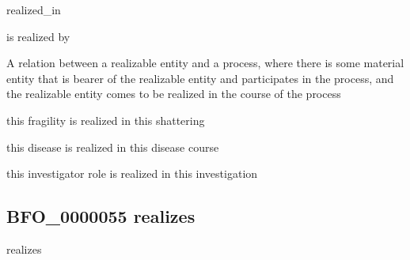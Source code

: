 \documentclass[letterpaper,10pt,english]{sphinxmanual}
\begin{document}
\begin{sphinxShadowBox}

\sphinxAtStartPar
realized\_in

\sphinxAtStartPar
is realized by
\end{sphinxShadowBox}

\begin{sphinxShadowBox}

\sphinxAtStartPar
{}
\end{sphinxShadowBox}

\begin{sphinxShadowBox}

\sphinxAtStartPar
A relation between a realizable entity and a process, where there is some material entity that is bearer of the realizable entity and participates in the process, and the realizable entity comes to be realized in the course of the process
\end{sphinxShadowBox}

\begin{sphinxShadowBox}

\sphinxAtStartPar
this fragility is realized in this shattering

\sphinxAtStartPar
this disease is realized in this disease course

\sphinxAtStartPar
this investigator role is realized in this investigation
\end{sphinxShadowBox}

\begin{sphinxShadowBox}

\sphinxAtStartPar
{}
\end{sphinxShadowBox}
\begin{quote}

\ignorespaces \end{quote}


\subsection{BFO\_0000055 \sphinxhyphen{} realizes}
\label{\detokenize{doc-BFO_0000055:bfo-0000055-realizes}}\label{\detokenize{doc-BFO_0000055:index-0}}\label{\detokenize{doc-BFO_0000055::doc}}
\begin{sphinxShadowBox}

\sphinxAtStartPar
realizes
\end{sphinxShadowBox}
\end{document}
